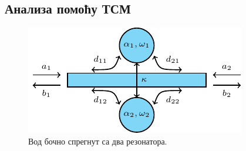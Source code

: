 \documentclass[main.tex]{subfiles}
\begin{document}
\subsection{Анализа помоћу ТСМ}\label{tsm:sec:cmt}
\begin{figure}
\centering
\includegraphics[scale=1]{sl_tsm/smfig.pdf}
\caption{Вод бочно спрегнут са два резонатора.}
\label{tsm:smfig}
\end{figure}
\end{document}
